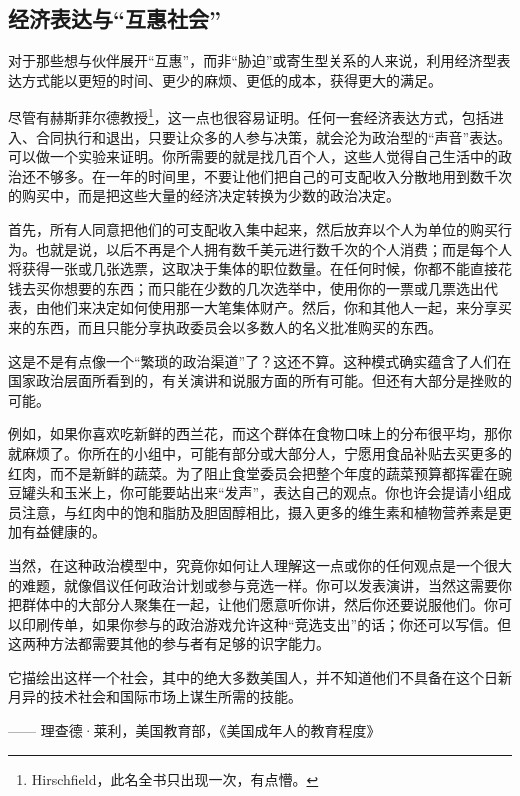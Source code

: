 \subsection{经济表达与“互惠社会”}
对于那些想与伙伴展开“互惠”，而非“胁迫”或寄生型关系的人来说，利用经济型表达方式能以更短的时间、更少的麻烦、更低的成本，获得更大的满足。

尽管有赫斯菲尔德教授\footnote{Hirschfield，此名全书只出现一次，有点懵。}，这一点也很容易证明。任何一套经济表达方式，包括进入、合同执行和退出，只要让众多的人参与决策，就会沦为政治型的“声音”表达。可以做一个实验来证明。你所需要的就是找几百个人，这些人觉得自己生活中的政治还不够多。在一年的时间里，不要让他们把自己的可支配收入分散地用到数千次的购买中，而是把这些大量的经济决定转换为少数的政治决定。

首先，所有人同意把他们的可支配收入集中起来，然后放弃以个人为单位的购买行为。也就是说，以后不再是个人拥有数千美元进行数千次的个人消费；而是每个人将获得一张或几张选票，这取决于集体的职位数量。在任何时候，你都不能直接花钱去买你想要的东西；而只能在少数的几次选举中，使用你的一票或几票选出代表，由他们来决定如何使用那一大笔集体财产。然后，你和其他人一起，来分享买来的东西，而且只能分享执政委员会以多数人的名义批准购买的东西。

这是不是有点像一个“繁琐的政治渠道”了？这还不算。这种模式确实蕴含了人们在国家政治层面所看到的，有关演讲和说服方面的所有可能。但还有大部分是挫败的可能。

例如，如果你喜欢吃新鲜的西兰花，而这个群体在食物口味上的分布很平均，那你就麻烦了。你所在的小组中，可能有部分或大部分人，宁愿用食品补贴去买更多的红肉，而不是新鲜的蔬菜。为了阻止食堂委员会把整个年度的蔬菜预算都挥霍在豌豆罐头和玉米上，你可能要站出来“发声”，表达自己的观点。你也许会提请小组成员注意，与红肉中的饱和脂肪及胆固醇相比，摄入更多的维生素和植物营养素是更加有益健康的。

当然，在这种政治模型中，究竟你如何让人理解这一点或你的任何观点是一个很大的难题，就像倡议任何政治计划或参与竞选一样。你可以发表演讲，当然这需要你把群体中的大部分人聚集在一起，让他们愿意听你讲，然后你还要说服他们。你可以印刷传单，如果你参与的政治游戏允许这种“竞选支出”的话；你还可以写信。但这两种方法都需要其他的参与者有足够的识字能力。

\begin{tcolorbox}
\kaishu 它描绘出这样一个社会，其中的绝大多数美国人，并不知道他们不具备在这个日新月异的技术社会和国际市场上谋生所需的技能。
\begin{flushright}
—— 理查德·莱利，美国教育部，《美国成年人的教育程度》
\end{flushright}
\end{tcolorbox}

